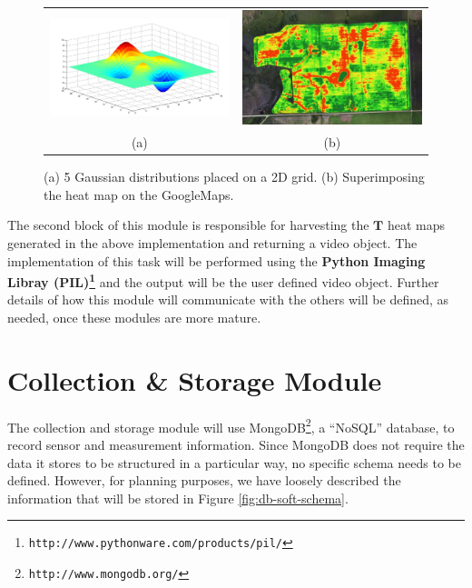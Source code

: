 \documentclass{article}
\begin{document}
\begin{figure}[!htbp]
\begin{center}
\begin{tabular}{c c}
\includegraphics[width=0.45\linewidth]{Images/multipleGaus.jpg}&
\includegraphics[width=0.45\linewidth]{Images/HeatMap.jpg}\\
(a) & (b)
\end{tabular}
\end{center}
\vspace{-0.15in}
\caption{\label{fig:Analytics} {(a) 5 Gaussian distributions placed on a 2D grid. (b) Superimposing the heat map on the GoogleMaps. }}
\end{figure}

The second block of this module is responsible for harvesting the $\mathbf{T}$ heat maps generated in the above implementation and returning a video object. The implementation of this task will be performed using the \textbf{Python Imaging Libray (PIL)\footnote{\texttt{http://www.pythonware.com/products/pil/}}} and the output will be the user defined video object. Further details of how this module will communicate with the others will be defined, as needed, once these modules are more mature.

\section{Collection \& Storage Module}
The collection and storage module will use MongoDB\footnote{\texttt{http://www.mongodb.org/}}, a ``NoSQL'' database,
to record sensor and measurement information. 
Since MongoDB does not require the data it stores to be structured in a particular way,
no specific schema needs to be defined.
However, for planning purposes, we have loosely described the information
that will be stored in Figure \ref{fig:db-soft-schema}.
\end{document}
